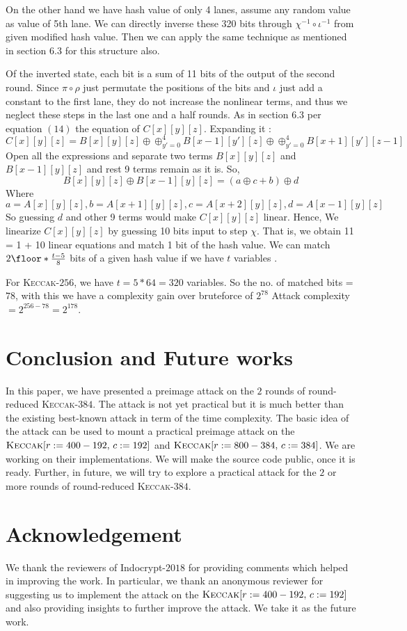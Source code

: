 \documentclass[runningheads]{llncs}
\newcommand{\KECCAK}{\mbox{\textsc{Keccak}}}
\newcommand{\Keccak}{\mbox{\textsc{Keccak}}}
\begin{document}
On the other hand we have hash value of only 4 lanes, assume any random value as value of 5th lane.
We can directly inverse these 320 bits through $\chi^{-1} \circ \iota^{-1}$ from given modified hash value.
Then we can apply the same technique as mentioned in section 6.3 \cite{guo2016linear} for this structure also. 

Of the inverted state, each bit is a sum of 11 bits of the output of the second round. Since $\pi \circ \rho$ just permutate the positions of the bits and $\iota$ just add a constant to the first lane, they do not increase the nonlinear terms, and thus we neglect these steps in the last one and a half rounds. As in section 6.3 per equation $(14)$ the equation of $C[x][y][z]$. Expanding it :
    \[
        C[x][y][z] = B[x][y][z] \oplus \oplus_{y' = 0}^{4} B[x-1][y'][z] \oplus \oplus_{y' = 0}^{4} B[x+1][y'][z-1]
    \]
    Open all the expressions and separate two terms $B[x][y][z]$ and $B[x-1][y][z]$ and rest 9 terms remain as it is.
    So, \[ B[x][y][z] \oplus B[x-1][y][z] = (a \oplus c + b) \oplus d
    \]
    Where \[
        a = A[x][y][z], b = A[x + 1][y][z], c = A[x + 2][y][z], d = A[x - 1][y][z]
    \]
    So guessing $d$ and other 9 terms would make $C[x][y][z]$ linear. Hence, We linearize $C[x][y][z]$ by guessing 10 bits input to step $\chi$. That is, we obtain 11 = 1 + 10 linear equations and match 1 bit of the hash value.
We can match $2\floor*{\frac{t - 5}{8}}$ bits of a given hash value if we have $t$ variables \cite{guo2016linear}.

For \Keccak-$256$, we have $t = 5*64 = 320$ variables.
So the no. of matched bits = $78$, with this we have a complexity gain over bruteforce of $2^{78}$
Attack complexity $ = 2^{256 - 78} = 2^{178}$.

\section{Conclusion and Future works}
In this paper, we have presented a preimage attack on the $2$ rounds of round-reduced \KECCAK-$384$. The attack is not yet practical but it is much better than the existing best-known attack in term of the time complexity. The basic idea of the attack can be used to mount a practical preimage attack on the $\Keccak[r:=400-192,\, c:=192]$ and $\Keccak[r:=800-384,\,c:=384]$. 
We are working on their implementations. We will make the source code public, once it is ready. 
Further, in future, we will try to explore a practical attack for the $2$ or more rounds of round-reduced \KECCAK-$384$.

\section*{Acknowledgement} We thank the reviewers of Indocrypt-$2018$ for providing comments which helped in
improving the work. In particular, we thank an anonymous reviewer for suggesting us to implement the attack on the $\Keccak[r:=400-192,\, c:=192]$ and also providing insights to further improve the attack. We take it as the future work. 
\nocite{*}



\end{document}
